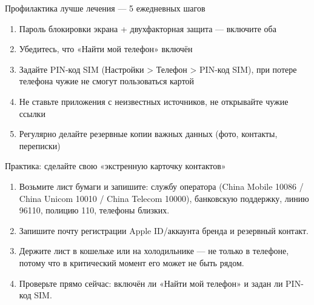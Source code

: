 \begin{tcbwarn}{Профилактика лучше лечения — 5 ежедневных шагов}
\begin{enumerate}
  \item Пароль блокировки экрана + двухфакторная защита — включите оба
  \item Убедитесь, что «Найти мой телефон» включён
  \item Задайте PIN-код SIM (Настройки > Телефон > PIN-код SIM), при потере телефона чужие не смогут пользоваться картой
  \item Не ставьте приложения с неизвестных источников, не открывайте чужие ссылки
  \item Регулярно делайте резервные копии важных данных (фото, контакты, переписки)
\end{enumerate}

\end{tcbwarn}

\begin{tcbpractice}{Практика: сделайте свою «экстренную карточку контактов»}
\begin{enumerate}
  \item Возьмите лист бумаги и запишите: службу оператора (China Mobile 10086 / China Unicom 10010 / China Telecom 10000), банковскую поддержку, линию 96110, полицию 110, телефоны близких.
  \item Запишите почту регистрации Apple ID/аккаунта бренда и резервный контакт.
  \item Держите лист в кошельке или на холодильнике — не только в телефоне, потому что в критический момент его может не быть рядом.
  \item Проверьте прямо сейчас: включён ли «Найти мой телефон» и задан ли PIN-код SIM.
\end{enumerate}

\end{tcbpractice}


